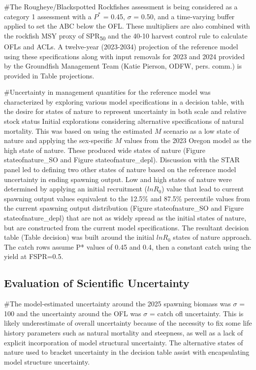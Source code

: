 \documentclass[
]{scrartcl}
\begin{document}
\#The Rougheye/Blackspotted Rockfishes assessment is being considered as
a category 1 assessment with a \(P^*\) = 0.45, \(\sigma\) = 0.50, and a
time-varying buffer applied to set the ABC below the OFL. These
multipliers are also combined with the rockfish MSY proxy of
SPR\textsubscript{50} and the 40-10 harvest control rule to calculate
OFLs and ACLs. A twelve-year (2023-2034) projection of the reference
model using these specifications along with input removals for 2023 and
2024 provided by the Groundfish Management Team (Katie Pierson, ODFW,
pers. comm.) is provided in Table projections.

\#Uncertainty in management quantities for the reference model was
characterized by exploring various model specifications in a decision
table, with the desire for states of nature to represent uncertainty in
both scale and relative stock status Initial explorations considering
alternative specifications of natural mortality. This was based on using
the estimated \(M\) scenario as a low state of nature and applying the
sex-specific \(M\) values from the 2023 Oregon model as the high state
of nature. These produced wide states of nature (Figure
stateofnature\_SO and Figure stateofnature\_depl). Discussion with the
STAR panel led to defining two other states of nature based on the
reference model uncertainty in ending spawning output. Low and high
states of nature were determined by applying an initial recruitment
(\(lnR_0\)) value that lead to current spawning output values equivalent
to the 12.5\% and 87.5\% percentile values from the current spawning
output distribution (Figure stateofnature\_SO and Figure
stateofnature\_depl) that are not as widely spread as the initial states
of nature, but are constructed from the current model specifications.
The resultant decision table (Table decision) was built around the
initial \(lnR_0\) states of nature approach. The catch rows assume P*
values of 0.45 and 0.4, then a constant catch using the yield at
FSPR=0.5.

\subsection{Evaluation of Scientific
Uncertainty}\label{evaluation-of-scientific-uncertainty}

\#The model-estimated uncertainty around the 2025 spawning biomass was
\(\sigma\) = 100 and the uncertainty around the OFL was \(\sigma\) =
catch ofl uncertainty. This is likely underestimate of overall
uncertainty because of the necessity to fix some life history parameters
such as natural mortality and steepness, as well as a lack of explicit
incorporation of model structural uncertainty. The alternative states of
nature used to bracket uncertainty in the decision table assist with
encapsulating model structure uncertainty.
\end{document}
